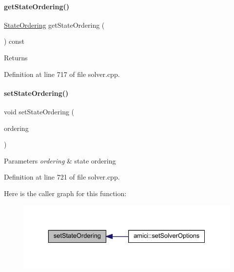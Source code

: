 \paragraph{\texorpdfstring{get\+State\+Ordering()}{getStateOrdering()}}
{\footnotesize\ttfamily \mbox{\hyperlink{namespaceamici_a890d968060d6d830aeed98dbeb04447f}{State\+Ordering}} get\+State\+Ordering (\begin{DoxyParamCaption}{ }\end{DoxyParamCaption}) const}

\begin{DoxyReturn}{Returns}

\end{DoxyReturn}


Definition at line 717 of file solver.\+cpp.

\mbox{\label{classamici_1_1_solver_aa22ae4579c350a6f3fae2e3b5a0da1de}} 
\paragraph{\texorpdfstring{set\+State\+Ordering()}{setStateOrdering()}}
{\footnotesize\ttfamily void set\+State\+Ordering (\begin{DoxyParamCaption}\item[{\mbox{\hyperlink{namespaceamici_a890d968060d6d830aeed98dbeb04447f}{State\+Ordering}}}]{ordering }\end{DoxyParamCaption})}


\begin{DoxyParams}{Parameters}
{\em ordering} & state ordering \\
\hline
\end{DoxyParams}


Definition at line 721 of file solver.\+cpp.

Here is the caller graph for this function\+:
\nopagebreak
\begin{figure}[H]
\begin{center}
\leavevmode
\includegraphics[width=329pt]{classamici_1_1_solver_aa22ae4579c350a6f3fae2e3b5a0da1de_icgraph}
\end{center}
\end{figure}
\mbox{\label{classamici_1_1_solver_ae1e9c3c5e59413ae25fb67c29983e3f3}} 
